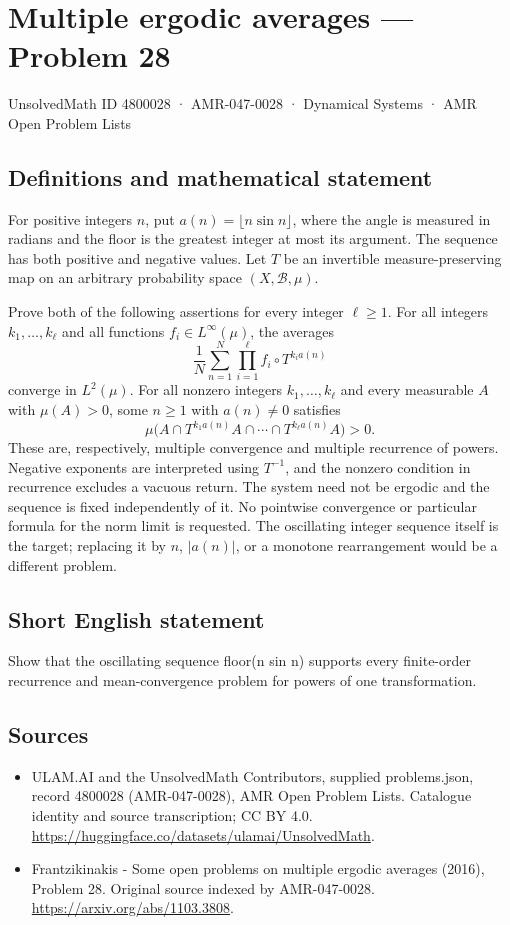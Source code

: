 \documentclass[11pt,a4paper]{article}
\begin{document}
\section*{Multiple ergodic averages — Problem 28}\label{4800028}
{\small UnsolvedMath ID 4800028 · AMR-047-0028 · Dynamical Systems · AMR Open Problem Lists}
\subsection{Definitions and mathematical statement}
For positive integers $n$, put $a(n)=\lfloor n\sin n\rfloor$,
where the angle is measured in radians and the floor
is the greatest integer at most its argument.
The sequence has both positive and negative values.
Let $T$ be an invertible measure-preserving map on
an arbitrary probability space $(X,\mathcal B,\mu)$.

Prove both of the following assertions for every
integer $\ell\ge1$. For all integers
$k_1,\ldots,k_\ell$ and all functions
$f_i\in L^\infty(\mu)$, the averages
\[
             \frac1N\sum_{n=1}^N\prod_{i=1}^\ell
                             f_i\circ T^{k_i a(n)}
\]
converge in $L^2(\mu)$. For all nonzero integers
$k_1,\ldots,k_\ell$ and every measurable $A$
with $\mu(A)>0$, some $n\ge1$ with $a(n)\ne0$
satisfies
\[
            \mu\bigl(A\cap T^{k_1a(n)}A\cap\cdots
                              \cap T^{k_\ell a(n)}A\bigr)>0.
\]
These are, respectively, multiple convergence and
multiple recurrence of powers. Negative exponents
are interpreted using $T^{-1}$, and the nonzero
condition in recurrence excludes a vacuous return.
The system need not be ergodic and the sequence
is fixed independently of it. No pointwise
convergence or particular formula for the norm
limit is requested. The oscillating integer
sequence itself is the target; replacing it by
$n$, $|a(n)|$, or a monotone rearrangement would
be a different problem.
\subsection{Short English statement}
Show that the oscillating sequence floor(n sin n) supports every finite-order recurrence and mean-convergence problem for powers of one transformation.
\subsection{Sources}
\begin{itemize}
\item[S1] ULAM.AI and the UnsolvedMath Contributors, supplied problems.json, record 4800028 (AMR-047-0028), AMR Open Problem Lists. Catalogue identity and source transcription; CC BY 4.0.
\url{https://huggingface.co/datasets/ulamai/UnsolvedMath}.
\item[S2] Frantzikinakis - Some open problems on multiple ergodic averages (2016), Problem 28. Original source indexed by AMR-047-0028.
\url{https://arxiv.org/abs/1103.3808}.
\end{itemize}
\end{document}
